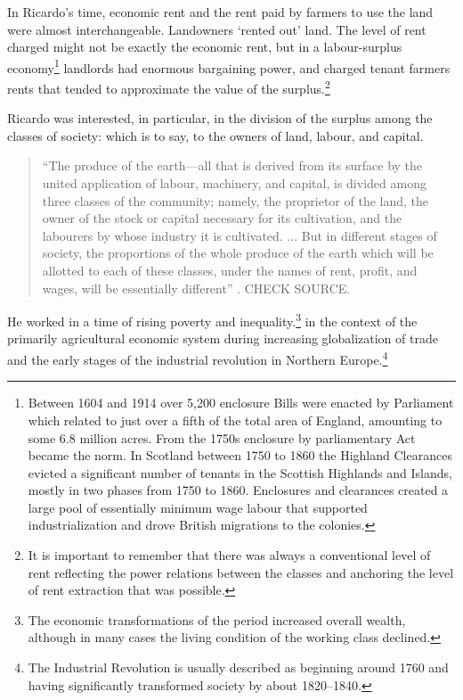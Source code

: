 In Ricardo's time, economic rent and the rent paid by farmers to use the land were almost interchangeable. Landowners `rented out' land. The level of rent charged might not be exactly the economic rent, but in a labour-surplus economy\footnote{Between 1604 and 1914 over 5,200 enclosure Bills were enacted by Parliament which related to just over a fifth of the total area of England, amounting to some 6.8 million acres. From the 1750s enclosure by parliamentary Act became the norm. In Scotland  between 1750 to 1860 the  Highland Clearances  evicted a significant number of tenants in the Scottish Highlands and Islands, mostly in two phases from 1750 to 1860. Enclosures and clearances created a large pool of essentially minimum wage labour that supported industrialization and drove British migrations to the colonies.} landlords had enormous bargaining power, and charged tenant farmers rents that tended to approximate the value of the \gls{surplus}.\footnote{It is important to remember that there was always a conventional level of rent reflecting the power relations between the classes and anchoring the level of rent extraction that was possible. } %

Ricardo was interested, in particular, in the division of the surplus among the classes of society:  which is to say, to the owners of land, labour, and capital.\begin{quotation}
 ``The produce of the earth---all that is derived from its surface by the united application of labour, machinery, and capital, is divided among three classes of the community; namely, the proprietor of the land, the owner of the stock or capital necessary for its cultivation, and the labourers by whose industry it is cultivated. ...  But in different stages of society, the proportions of the whole produce of the earth which will be allotted to each of these classes, under the names of rent, profit, and wages, will be essentially different''  \cite{ricardoEssayInfluenceLow1815}. CHECK SOURCE.
\end{quotation}

He worked in a time of rising poverty and inequality.\footnote{The economic transformations of the period increased overall wealth, although in many cases the living condition of the working class declined.} in the context of the primarily agricultural economic system during increasing globalization of trade and the early stages of the industrial revolution in Northern Europe.\footnote{The Industrial Revolution is usually described as beginning around 1760 and having significantly transformed society by about 1820--1840.} %


